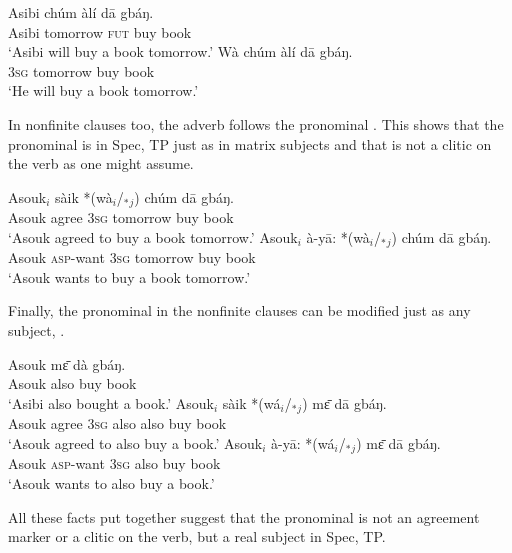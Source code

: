 \documentclass[output=paper,colorlinks,citecolor=brown]{langscibook}
\begin{document}
\ea%
    \label{ex:sulemana:26}
    \ea%
    \label{ex:sulemana:26a}
    \gll    Asibi chúm àlí dā gbáŋ. \\
            Asibi tomorrow \textsc{fut} buy book\\
    \glt    `Asibi will buy a book tomorrow.' 
    \ex%
    \label{ex:sulemana:26b}
    \gll    Wà chúm àlí dā gbáŋ. \\
            \textsc{3sg} tomorrow buy book\\
    \glt    `He will buy a book tomorrow.' 
    \z
\z

In nonfinite clauses too, the adverb follows the pronominal . This shows that the pronominal is in Spec, TP just as in matrix subjects and that is not a clitic on the verb as one might assume. 

\ea%
    \label{ex:sulemana:27}
    \ea%
    \label{ex:sulemana:27a}
    \gll    Asouk$_i$ sàik *(wà$_i$/$_*${}$_j$) chúm dā gbáŋ.\\
            Asouk agree \textsc{3sg} tomorrow buy book\\
    \glt    `Asouk agreed to buy a book tomorrow.'
    \ex%
    \label{ex:sulemana:27b}
    \gll    Asouk$_i$ à-yā:  *(wà$_i$/$_*${}$_j$) chúm dā gbáŋ.\\
            Asouk  \textsc{asp}-want \textsc{3sg} tomorrow buy book\\
    \glt    `Asouk wants to buy a book tomorrow.'  
    \z
\z

Finally, the pronominal in the nonfinite clauses can be modified just as any subject, .

\ea%
    \label{ex:sulemana:28}
    \ea%
    \label{ex:sulemana:28a}
    \gll    Asouk mɛ̄ dà gbáŋ.\\
            Asouk also buy book\\
    \glt    `Asibi also bought a book.' 
    \ex%
    \label{ex:sulemana:28b}
    \gll    Asouk$_i$ sàik *(wá$_i$/$_*${}$_j$) mɛ̄ dā gbáŋ.\\
            Asouk agree \textsc{3sg} also also buy book\\
    \glt    `Asouk agreed to also buy a book.'
    \ex%
    \label{ex:sulemana:28c}
    \gll    Asouk$_i$ à-yā:  *(wá$_i$/$_*${}$_j$) mɛ̄ dā gbáŋ.\\
            Asouk \textsc{asp}-want \textsc{3sg} also buy book\\
    \glt    `Asouk wants to also buy a book.'  
    \z
\z

All these facts put together suggest that the pronominal is not an agreement marker or a clitic on the verb, but a real subject in Spec, TP. 
\end{document}
